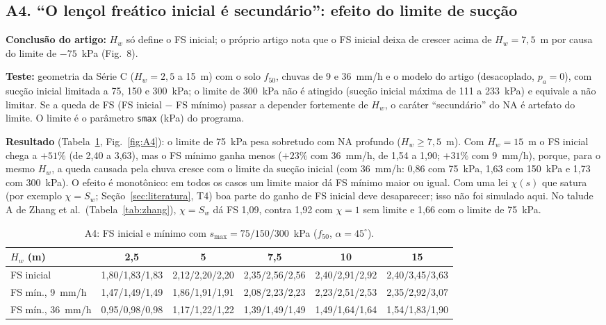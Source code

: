 \subsection{A4. ``O len\c{c}ol fre\'atico inicial \'e secund\'ario'': efeito do limite de suc\c{c}\~ao}

\textbf{Conclus\~ao do artigo:} $H_w$ s\'o define o FS inicial; o pr\'oprio artigo nota que o FS inicial deixa de
crescer acima de $H_w=7{,}5$~m por causa do limite de $-75$~kPa (Fig.~8).

\textbf{Teste:} geometria da S\'erie C ($H_w=2{,}5$ a 15~m) com o solo $f_{50}$, chuvas de 9 e 36~mm/h e o modelo do
artigo (desacoplado, $p_a=0$), com suc\c{c}\~ao inicial limitada a 75, 150 e 300~kPa; o limite de 300~kPa n\~ao \'e
atingido (suc\c{c}\~ao inicial m\'axima de 111 a 233~kPa) e equivale a n\~ao limitar. Se a queda de FS (FS inicial
$-$ FS m\'inimo) passar a depender fortemente de $H_w$, o car\'ater ``secund\'ario'' do NA \'e artefato do limite. O
limite \'e o par\^ametro \texttt{smax} (kPa) do programa.

\textbf{Resultado} (Tabela~\ref{tab:A4}, Fig.~\ref{fig:A4}): o limite de 75~kPa pesa sobretudo com NA profundo
($H_w\ge7{,}5$~m). Com $H_w=15$~m o FS inicial chega a $+51\%$ (de 2,40 a 3,63), mas o FS m\'inimo ganha menos
($+23\%$ com 36~mm/h, de 1,54 a 1,90; $+31\%$ com 9~mm/h), porque, para o mesmo $H_w$, a queda causada pela chuva
cresce com o limite da suc\c{c}\~ao inicial (com 36~mm/h: 0,86 com 75~kPa, 1,63 com 150~kPa e 1,73 com 300~kPa). O
efeito \'e monot\^onico: em todos os casos um limite maior d\'a FS m\'inimo maior ou igual. Com uma lei $\chi(s)$ que
satura (por exemplo $\chi=S_w$; Se\c{c}\~ao~\ref{sec:literatura}, T4) boa parte do ganho de FS inicial deve
desaparecer; isso n\~ao foi simulado aqui. No talude A de Zhang et al.\ (Tabela~\ref{tab:zhang}), $\chi=S_w$ d\'a FS
1,09, contra 1,92 com $\chi=1$ sem limite e 1,66 com o limite de 75~kPa.

\begin{table}[h!]
\centering\small
\caption{A4: FS inicial e m\'inimo com $s_{\max}=75/150/300$~kPa ($f_{50}$, $\alpha=45^\circ$).}\label{tab:A4}
\begin{tabular}{lccccc}
\toprule
$H_w$ (m) & 2,5 & 5 & 7,5 & 10 & 15\\
\midrule
FS inicial & 1,80/1,83/1,83 & 2,12/2,20/2,20 & 2,35/2,56/2,56 & 2,40/2,91/2,92 & 2,40/3,45/3,63\\
FS m\'in., 9~mm/h & 1,47/1,49/1,49 & 1,86/1,91/1,91 & 2,08/2,23/2,23 & 2,23/2,51/2,53 & 2,35/2,92/3,07\\
FS m\'in., 36~mm/h & 0,95/0,98/0,98 & 1,17/1,22/1,22 & 1,39/1,49/1,49 & 1,49/1,64/1,64 & 1,54/1,83/1,90\\
\bottomrule
\end{tabular}
\end{table}

